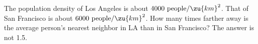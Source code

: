   The population density of Los Angeles is about 
$4000\ \text{people}/\zu{km}^2$. That of San Francisco is about 
$6000\ \text{people}/\zu{km}^2$. How many times farther away is the average
person's nearest neighbor in LA than in San Francisco?
The answer is not 1.5. \answercheck

